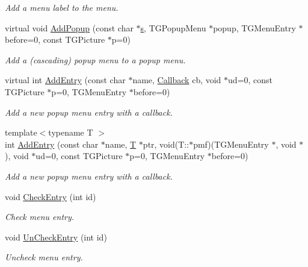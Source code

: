 \begin{DoxyCompactItemize}
\begin{DoxyCompactList}\small\item\em Add a menu label to the menu. \end{DoxyCompactList}\item 
virtual void \hyperlink{class_d_d4hep_1_1_popup_menu_a8c29cafca2fe99eb2f561ed130616b7f}{Add\+Popup} (const char $\ast$\hyperlink{_volumes_8cpp_a17ca6bfc8040d695d3cada22a4763d40}{s}, T\+G\+Popup\+Menu $\ast$popup, T\+G\+Menu\+Entry $\ast$before=0, const T\+G\+Picture $\ast$p=0)
\begin{DoxyCompactList}\small\item\em Add a (cascading) popup menu to a popup menu. \end{DoxyCompactList}\item 
virtual int \hyperlink{class_d_d4hep_1_1_popup_menu_a31d232887f2d18d1437836641cdf9c62}{Add\+Entry} (const char $\ast$name, \hyperlink{class_d_d4hep_1_1_callback}{Callback} cb, void $\ast$ud=0, const T\+G\+Picture $\ast$p=0, T\+G\+Menu\+Entry $\ast$before=0)
\begin{DoxyCompactList}\small\item\em Add a new popup menu entry with a callback. \end{DoxyCompactList}\item 
{\footnotesize template$<$typename T $>$ }\\int \hyperlink{class_d_d4hep_1_1_popup_menu_ad08bf5896097b7d0cc241830c6952b45}{Add\+Entry} (const char $\ast$name, \hyperlink{class_t}{T} $\ast$ptr, void(T\+::$\ast$pmf)(T\+G\+Menu\+Entry $\ast$, void $\ast$), void $\ast$ud=0, const T\+G\+Picture $\ast$p=0, T\+G\+Menu\+Entry $\ast$before=0)
\begin{DoxyCompactList}\small\item\em Add a new popup menu entry with a callback. \end{DoxyCompactList}\item 
void \hyperlink{class_d_d4hep_1_1_popup_menu_aacbb6570c064253d647ef4129a0bc7c8}{Check\+Entry} (int id)
\begin{DoxyCompactList}\small\item\em Check menu entry. \end{DoxyCompactList}\item 
void \hyperlink{class_d_d4hep_1_1_popup_menu_aca647cd86c210af4bf0f4e48f487a341}{Un\+Check\+Entry} (int id)
\begin{DoxyCompactList}\small\item\em Uncheck menu entry. \end{DoxyCompactList}\item 

\end{DoxyCompactItemize}
